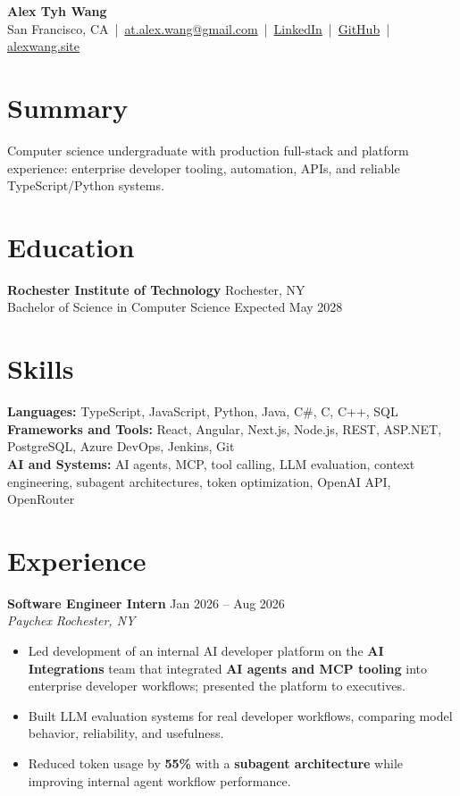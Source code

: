 \documentclass[10pt,letterpaper]{article}
\newif\ifresumeFirstRole
\newcommand{\resumeRole}[4]{%
  \ifresumeFirstRole
    \global\resumeFirstRolefalse
  \else
    \vspace{0pt plus 1fill}%
  \fi
  \textbf{#1} \hfill #2\\
  \textit{#3} \hfill \textit{#4}
}
\begin{document}
\begin{center}
{\Large \textbf{Alex Tyh Wang}}\\
San Francisco, CA \,|\, \href{mailto:at.alex.wang@gmail.com}{at.alex.wang@gmail.com} \,|\, \href{https://www.linkedin.com/in/alex-tyh-wang/}{LinkedIn} \,|\, \href{https://github.com/alextyhwang}{GitHub} \,|\, \href{https://alexwang.site}{alexwang.site}
\end{center}

\section*{Summary}
Computer science undergraduate with production full-stack and platform experience: enterprise developer tooling, automation, APIs, and reliable TypeScript/Python systems.

\section*{Education}
\textbf{Rochester Institute of Technology} \hfill Rochester, NY\\
Bachelor of Science in Computer Science \hfill Expected May 2028

\section*{Skills}
\textbf{Languages:} TypeScript, JavaScript, Python, Java, C\#, C, C++, SQL\\
\textbf{Frameworks and Tools:} React, Angular, Next.js, Node.js, REST, ASP.NET, PostgreSQL, Azure DevOps, Jenkins, Git\\
\textbf{AI and Systems:} AI agents, MCP, tool calling, LLM evaluation, context engineering, subagent architectures, token optimization, OpenAI API, OpenRouter

\section*{Experience}
\resumeRole{Software Engineer Intern}{Jan 2026 -- Aug 2026}{Paychex}{Rochester, NY}
\begin{itemize}
  \item Led development of an internal AI developer platform on the \textbf{AI Integrations} team that integrated \textbf{AI agents and MCP tooling} into enterprise developer workflows; presented the platform to executives.
  \item Built LLM evaluation systems for real developer workflows, comparing model behavior, reliability, and usefulness.
  \item Reduced token usage by \textbf{55\%} with a \textbf{subagent architecture} while improving internal agent workflow performance.
\end{itemize}
\end{document}
